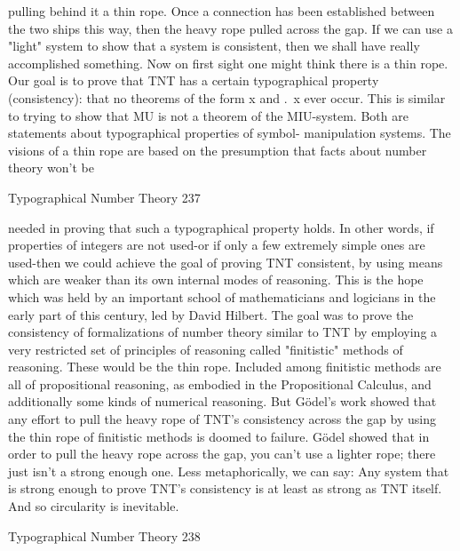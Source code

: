 pulling behind it a thin rope. Once a connection has been established between the two
ships this way, then the heavy rope pulled across the gap. If we can use a "light" system
to show that a system is consistent, then we shall have really accomplished something.
        Now on first sight one might think there is a thin rope. Our goal is to prove that
TNT has a certain typographical property (consistency): that no theorems of the form x
and .~x ever occur. This is similar to trying to show that MU is not a theorem of the
MIU-system. Both are statements about typographical properties of symbol-
manipulation systems. The visions of a thin rope are based on the presumption that facts
about number theory won’t be




Typographical Number Theory                                                             237

needed in proving that such a typographical property holds. In other words, if properties
of integers are not used-or if only a few extremely simple ones are used-then we could
achieve the goal of proving TNT consistent, by using means which are weaker than its
own internal modes of reasoning.
         This is the hope which was held by an important school of mathematicians and
logicians in the early part of this century, led by David Hilbert. The goal was to prove the
consistency of formalizations of number theory similar to TNT by employing a very
restricted set of principles of reasoning called "finitistic" methods of reasoning. These
would be the thin rope. Included among finitistic methods are all of propositional
reasoning, as embodied in the Propositional Calculus, and additionally some kinds of
numerical reasoning. But Gödel’s work showed that any effort to pull the heavy rope of
TNT's consistency across the gap by using the thin rope of finitistic methods is doomed
to failure. Gödel showed that in order to pull the heavy rope across the gap, you can't use
a lighter rope; there just isn't a strong enough one. Less metaphorically, we can say: Any
system that is strong enough to prove TNT's consistency is at least as strong as TNT
itself. And so circularity is inevitable.




Typographical Number Theory                                                             238

